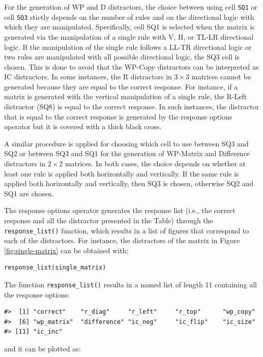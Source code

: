 For the generation of WP and D distractors, the choice between using cell \texttt{SQ1} or cell \texttt{SQ3} stictly depends on the number of rules and on the directional logic with which they are manipulated.
Specifically, cell SQ1 is selected when the matrix is generated via the manipulation of a single rule with V, H, or TL-LR directional logic.
If the manipulation of the single rule follows a LL-TR directional logic or two rules are manipulated with all possible directional logic, the SQ3 cell is chosen.
This is done to avoid that the WP-Copy distractors can be interpreted as IC distractors.
In some instances, the R distractors in \(3 \times 3\) matrices cannot be generated because they are equal to the correct response.
For instance, if a matrix is generated with the vertical manipulation of a single rule, the R-Left distractor (SQ8) is equal to the correct response.
In such instances, the distractor that is equal to the correct response is generated by the response options operator but it is covered with a thick black cross.

A similar procedure is applied for choosing which cell to use between SQ3 and SQ2 or between SQ3 and SQ1 for the generation of WP-Matrix and Difference distractors in \(2 \times 2\) matrices.
In both cases, the choice depends on whether at least one rule is applied both horizontally and vertically.
If the same rule is applied both horizontally and vertically, then SQ3 is chosen, otherwise SQ2 and SQ1 are chosen.

The response options operator generates the response list (i.e., the correct response and all the distractor presented in the Table) through the \texttt{response\_list()} function, which results in a list of figures that correspond to each of the distractors.
For instance, the distractors of the matrix in Figure \ref{fig:single-matrix} can be obtained with:

\begin{verbatim}
response_list(single_matrix)
\end{verbatim}

The function \texttt{response\_list()} results in a named list of length 11 containing all the response options:

\begin{verbatim}
#>  [1] "correct"    "r_diag"     "r_left"     "r_top"      "wp_copy"   
#>  [6] "wp_matrix"  "difference" "ic_neg"     "ic_flip"    "ic_size"   
#> [11] "ic_inc"
\end{verbatim}

and it can be plotted as:

